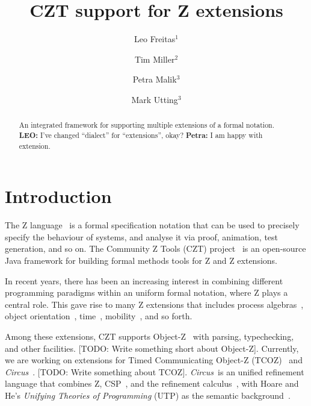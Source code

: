 \documentclass{llncs}
\newcommand{\Circus}{{\sf\slshape Circus}}
\begin{document}
\title{CZT support for Z extensions}
\author{Leo Freitas$^1$ \and Tim Miller$^2$ \and Petra Malik$^3$ \and Mark Utting$^3$}


\maketitle


\begin{abstract}
  An integrated framework for supporting multiple extensions of a formal
  notation.
  {\bf LEO:} I've changed ``dialect'' for ``extensions'', okay?
  {\bf Petra:} I am happy with extension.
\end{abstract}

\section{Introduction} \label{sec:intro}

  The Z language~\cite{isoz} is a formal specification notation that
  can be used to precisely specify the behaviour of systems, and
  analyse it via proof, animation, test generation, and so on.  The Community
  Z Tools (CZT) project~\cite{czt} is an open-source Java framework
  for building formal methods tools for Z and Z extensions.

  In recent years, there has been an increasing interest in combining
  different programming paradigms within an uniform formal notation,
  where Z plays a central role. This gave rise to many Z extensions that
  includes process algebras~\cite{fischer-1998,fischer-2000,circus.sem:intro},
  object orientation~\cite{oz,ohcircus}, time~\cite{tcoz,circus.sem:real.time2},
  mobility~\cite{circus.sem:mobility}, and so forth.

  Among these extensions, CZT supports Object-Z~\cite{oz} with
  parsing, typechecking, and other facilities.  [TODO: Write something
  short about Object-Z].  Currently, we are working on extensions for
  Timed Communicating Object-Z (TCOZ)~\cite{tcoz} and
  \Circus~\cite{circus.sem:intro}.  [TODO: Write something about
  TCOZ].  \Circus\ is an unified refinement language that combines Z,
  CSP~\cite{csp.books:roscoe}, and the refinement
  calculus~\cite{fm.ref:morgan}, with Hoare and He's \textit{Unifying
  Theories of Programming} (UTP) as the semantic
  background~\cite{hoare.utp}.
\end{document}
